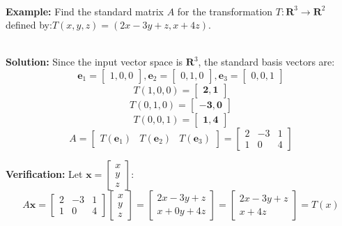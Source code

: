\documentclass[DIV=20,oneside]{scrartcl}
\newcommand{\solution}{
	\noindent\textbf{\\Solution: }
}
\newcommand{\example}{
	\noindent\textbf{\\Example: }
}
\begin{document}
\example Find the standard matrix $A$ for the transformation $T: \mathbf{R}^3 \to \mathbf{R}^2$ defined by:$T(x, y, z) = (2x - 3y + z, x + 4z)$.
\solution Since the input vector space is $\mathbf{R}^3$, the standard basis vectors are:$$\mathbf{e}_1 = \begin{bmatrix} 1, 0, 0 \end{bmatrix}, \mathbf{e}_2 = \begin{bmatrix} 0, 1, 0 \end{bmatrix}, \mathbf{e}_3 = \begin{bmatrix} 0 , 0, 1 \end{bmatrix}$$
$$T(1, 0, 0) = \mathbf{\begin{bmatrix} 2, 1 \end{bmatrix}}$$
$$T(0, 1, 0) = \mathbf{\begin{bmatrix} -3, 0 \end{bmatrix}}$$
$$T(0, 0, 1) = \mathbf{\begin{bmatrix} 1, 4 \end{bmatrix}}$$
$$A = \begin{bmatrix} T(\mathbf{e}_1) & T(\mathbf{e}_2) & T(\mathbf{e}_3) \end{bmatrix} = \begin{bmatrix} 2 & -3 & 1 \\ 1 & 0 & 4 \end{bmatrix}$$

\textbf{Verification:}
Let $\mathbf{x} = \begin{bmatrix} x \\ y \\ z \end{bmatrix}$:
$$A\mathbf{x} = \begin{bmatrix} 2 & -3 & 1 \\ 1 & 0 & 4 \end{bmatrix} \begin{bmatrix} x \\ y \\ z \end{bmatrix} = \begin{bmatrix} 2x - 3y + z \\ x + 0y + 4z \end{bmatrix} = \begin{bmatrix} 2x - 3y + z \\ x + 4z \end{bmatrix}=T(x)$$
\end{document}
